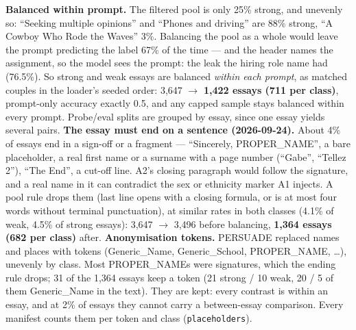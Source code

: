 {\textbf{Balanced within prompt.} The filtered pool is only 25\% strong, and unevenly so: ``Seeking multiple
opinions'' and ``Phones and driving'' are 88\% strong, ``A Cowboy Who Rode the Waves'' 3\%. Balancing the pool as
a whole would leave the prompt predicting the label 67\% of the time --- and the header names the assignment,
so the model sees the prompt: the leak the hiring role name had (76.5\%). So strong and weak essays are
balanced \emph{within each prompt}, as matched couples in the loader's seeded order: 3{,}647 $\to$
\textbf{1{,}422 essays (711 per class)}, prompt-only accuracy exactly 0.5, and any capped sample stays balanced
within every prompt. Probe/eval splits are grouped by essay, since one essay yields several pairs.
\textbf{The essay must end on a sentence (2026-09-24).} About 4\% of essays end in a sign-off or a fragment
--- ``Sincerely, PROPER\_NAME'', a bare placeholder, a real first name or a surname with a page number
(``Gabe'', ``Tellez 2''), ``The End'', a cut-off line. A2's closing paragraph would follow the signature, and a
real name in it can contradict the sex or ethnicity marker A1 injects. A pool rule drops them (last line opens
with a closing formula, or is at most four words without terminal punctuation), at similar rates in both
classes (4.1\% of weak, 4.5\% of strong essays): 3{,}647 $\to$ 3{,}496 before balancing, \textbf{1{,}364 essays
(682 per class)} after. \textbf{Anonymisation tokens.} PERSUADE replaced names and places with tokens
(Generic\_Name, Generic\_School, PROPER\_NAME, \dots), unevenly by class. Most PROPER\_NAMEs were signatures, which
the ending rule drops; 31 of the 1{,}364 essays keep a token (21 strong / 10 weak, 20 / 5 of them Generic\_Name in
the text). They are kept: every contrast is within an essay, and at 2\% of essays they cannot carry a
between-essay comparison. Every manifest counts them per token and class (\texttt{placeholders}).}

